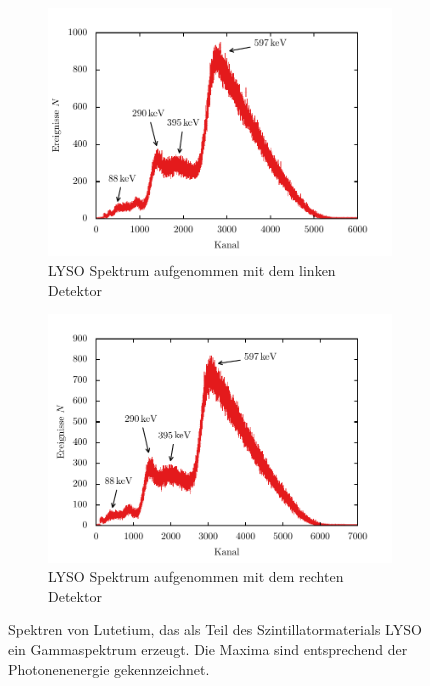 \documentclass[11pt, a4paper]{article}
\numberwithin{equation}{section}
\begin{document}
\begin{figure}[htbp]
	\centering
	\begin{subfigure}{\textwidth}
		\centering
		\includegraphics[width=\textwidth]{./figures/LYSO_links}
		\caption{LYSO Spektrum aufgenommen mit dem linken Detektor}
	\end{subfigure}
	\begin{subfigure}{\textwidth}
		\centering
		\includegraphics[width=\textwidth]{./figures/LYSO_rechts}
		\caption{LYSO Spektrum aufgenommen mit dem rechten Detektor}
	\end{subfigure}
	\caption{Spektren von Lutetium, das als Teil des Szintillatormaterials LYSO ein Gammaspektrum erzeugt. Die Maxima sind entsprechend der Photonenenergie gekennzeichnet.}
	\label{fig:lyso_spektren}
\end{figure}
\end{document}
